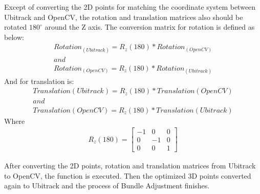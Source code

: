 Except of converting the 2D points for matching the coordinate system between Ubitrack and OpenCV, the rotation and translation matrices also should be rotated $180 ^{\circ}$ around the Z axis. The conversion matrix for rotation is defined as below:
\begin{gather*}
	Rotation_{(Ubitrack)} = R_{z}(180) * Rotation_{(OpenCV)}\\
	and\\
    Rotation_{(OpenCV)} = R_{z}(180) * Rotation_{(Ubitrack)}
\end{gather*}
And for translation is:
\begin{gather*}
	Translation{(Ubitrack)} = R_{z}(180) * Translation{(OpenCV)}\\
	and\\
    Translation{(OpenCV)} = R_{z}(180) * Translation{(Ubitrack)}
\end{gather*}
Where 
\begin{gather*}
	R_{z}(180) = \begin{bmatrix}
       -1 & 0 & 0   \\[0.3em]
       0 & -1 & 0   \\[0.3em]
       0  & 0 & 1
     \end{bmatrix}
\end{gather*}

After converting the 2D points, rotation and translation matrices from Ubitrack to OpenCV, the  function is executed. Then the optimized 3D points converted again to Ubitrack and the process of Bundle Adjustment finishes.\\

